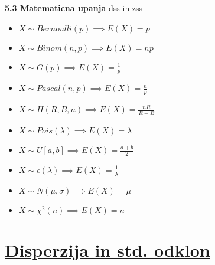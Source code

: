 \documentclass{article}
\begin{document}
\begin{multicols}{2}
	\textbf{5.3 Matematicna upanja} dss in zss
	\begin{itemize}
		\item \begin{math}
			      X \sim Bernoulli(p) \implies E(X) = p
		      \end{math}
		\item \begin{math}
			      X \sim Binom(n, p) \implies E(X) = np
		      \end{math}
		\item \begin{math}
			      X \sim G(p) \implies E(X) = \frac{1}{p}
		      \end{math}
		\item \begin{math}
			      X \sim Pascal(n, p) \implies E(X) = \frac{n}{p}
		      \end{math}
		\item
		      \begin{math}
			      X \sim H(R, B, n) \implies E(X) = \frac{nR}{R + B}
		      \end{math}
		\item \begin{math}
			      X \sim Pois(\lambda) \implies E(X) = \lambda
		      \end{math}
		\item \begin{math}
			      X \sim U[a, b] \implies E(X) = \frac{a + b}{2}
		      \end{math}
		\item  \begin{math}
			      X \sim \epsilon(\lambda) \implies E(X) = \frac{1}{\lambda}
		      \end{math}
		\item \begin{math}
			      X \sim N(\mu, \sigma ) \implies E(X) = \mu
		      \end{math}
		\item \begin{math}
			      X \sim \chi^{2}(n) \implies E(X) = n
		      \end{math}
	\end{itemize}

	\section{\underline{Disperzija in std. odklon}}


\end{multicols}
\end{document}
